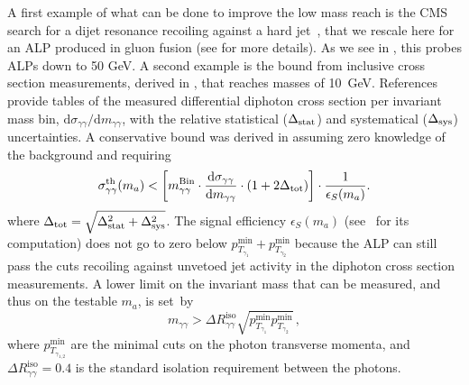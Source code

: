 A first example of what can be done to improve the low mass reach is the CMS search for a dijet resonance recoiling against a hard jet~\cite{Sirunyan:2017nvi}, that we rescale here for an ALP produced in gluon fusion (see  for more details). As we see in , this probes ALPs down to 50 GeV.
A second example is the bound from inclusive cross section measurements, derived in , that reaches masses of 10~GeV.
References \cite{Aaltonen:2012jd,Aad:2012tba,Aaboud:2017vol,Chatrchyan:2014fsa} provide tables of the measured differential diphoton cross section per invariant mass bin, $\text{d}\sigma_{\gamma\gamma}/\text{d} m_{\gamma\gamma}$, with the relative statistical ($\Delta_{\rm stat}$) and systematical ($\Delta_{\rm sys}$) uncertainties.
%
A conservative bound was derived in  assuming zero knowledge of the background and requiring
\begin{equation}
\sigma^{\text{th}}_{\gamma\gamma}(m_a)<\left[m_{\gamma\gamma}^{\rm Bin}\cdot \frac{\text{d}\sigma_{\gamma\gamma}}{\text{d} m_{\gamma\gamma}}\cdot(1+ 2\Delta_{\rm tot})\right] \cdot \frac{1}{\epsilon_S (m_a)}.
\label{eq:sensitivity}
\end{equation}
where $\Delta_{\text{tot}}=\sqrt{\Delta_{\rm stat}^2+\Delta_{\rm sys}^2}$.
The signal efficiency $\epsilon_S (m_a)$ (see~ for its computation) does not go to zero below  $p_{T_{\gamma_1}}^{\text{min}}+p_{T_{\gamma_2}}^{\text{min}}$  because the ALP can still pass the cuts recoiling against unvetoed jet activity in the diphoton cross section measurements.
A lower limit on the invariant mass that can be measured, and thus on the testable $m_a$, is set~by
\begin{equation}
m_{\gamma\gamma}> \Delta R_{\gamma\gamma}^{\text{iso}}\sqrt{p_{T_{\gamma_1}}^{\text{min}}p_{T_{\gamma_2}}^{\text{min}}}\,,
\end{equation}
where $p_{T_{\gamma_{1,2}}}^{\text{min}}$ are the minimal cuts on the photon transverse momenta,
and $\Delta R_{\gamma\gamma}^{\text{iso}}=0.4$ is the standard isolation requirement between the photons.


